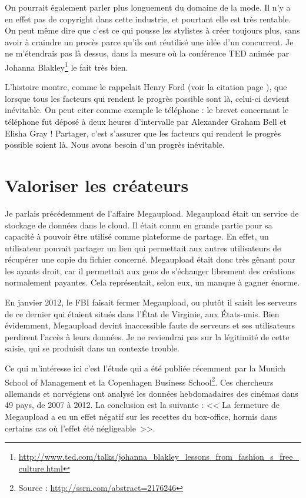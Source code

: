 On pourrait également parler plus longuement du domaine de la mode.
Il n'y a en effet pas de copyright dans cette industrie, et pourtant elle est très rentable.
On peut même dire que c'est ce qui pousse les stylistes à créer toujours plus, sans avoir à craindre un procès parce qu'ils ont réutilisé une idée d'un concurrent.
Je ne m'étendrais pas là dessus, dans la mesure où la conférence TED animée par Johanna Blakley\footnote{\url{http://www.ted.com/talks/johanna_blakley_lessons_from_fashion_s_free_culture.html}} le fait très bien.

L'histoire montre, comme le rappelait Henry Ford (voir la citation page \pageref{ford}), que lorsque tous les facteurs qui rendent le progrès possible sont là, celui-ci devient inévitable.
On peut citer comme exemple le téléphone : le brevet concernant le téléphone fut déposé à deux heures d'intervalle par Alexander Graham Bell et Elisha Gray !
Partager, c'est s'assurer que les facteurs qui rendent le progrès possible soient là.
Nous avons besoin d'un progrès inévitable.

\section{Valoriser les créateurs}

Je parlais précédemment de l'affaire Megaupload.
Megaupload était un service de stockage de données dans le cloud.
Il était connu en grande partie pour sa capacité à pouvoir être utilisé comme plateforme de partage.
En effet, un utilisateur pouvait partager un lien qui permettait aux autres utilisateurs de récupérer une copie du fichier concerné.
Megaupload était donc très gênant pour les ayants droit, car il permettait aux gens de s'échanger librement des créations normalement payantes.
Cela représentait, selon eux, un manque à gagner énorme.

En janvier 2012, le FBI faisait fermer Megaupload, ou plutôt il saisit les serveurs de ce dernier qui étaient situés dans l'État de Virginie, aux États-unis.
Bien évidemment, Megaupload devint inaccessible faute de serveurs et ses utilisateurs perdirent l'accès à leurs données.
Je ne reviendrai pas sur la légitimité de cette saisie, qui se produisit dans un contexte trouble.

Ce qui m'intéresse ici c'est l'étude qui a été publiée récemment par la Munich School of Management et la Copenhagen Business School\footnote{Source : \url{http://ssrn.com/abstract=2176246}}.
Ces chercheurs allemands et norvégiens ont analysé les données hebdomadaires des cinémas dans 49 pays, de 2007 à 2012.
La conclusion est la suivante : << La fermeture de Megaupload a eu un effet négatif sur les recettes du box-office, hormis dans certains cas où l'effet été négligeable~>>.

